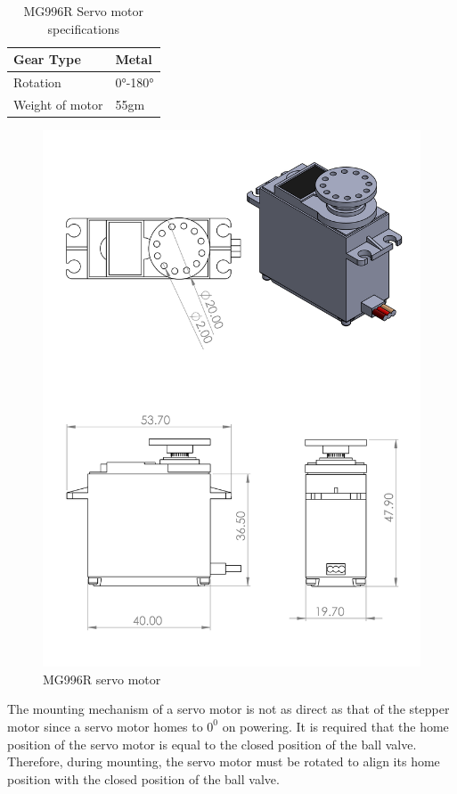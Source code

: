 \begin{enumerate}
\begin{enumerate}
\begin{table}[H]
\begin{tabular}{|l|l|}
    Gear Type & Metal \\ \hline
    Rotation & 0°-180° \\ \hline
    Weight of motor & 55gm \\ \hline
    \end{tabular}
    \caption[MG996R Servo motor specifications]{MG996R Servo motor specifications \cite{mg996r}}
    \label{tab:MG996R_servo_specs}
    \end{table}
    \begin{figure}[H]
        \centering
        \includegraphics{Figures/ServoMotorAssembly.PNG}
        \caption{MG996R servo motor}
        \label{fig:servo_motor_assembly}
    \end{figure}
    The mounting mechanism of a servo motor is not as direct as that of the stepper motor since a servo motor homes to $0^{0}$ on powering. It is required that the home position of the servo motor is equal to the closed position of the ball valve. Therefore, during mounting, the servo motor must be rotated to align its home position with the closed position of the ball valve.

\end{enumerate}
\end{enumerate}
